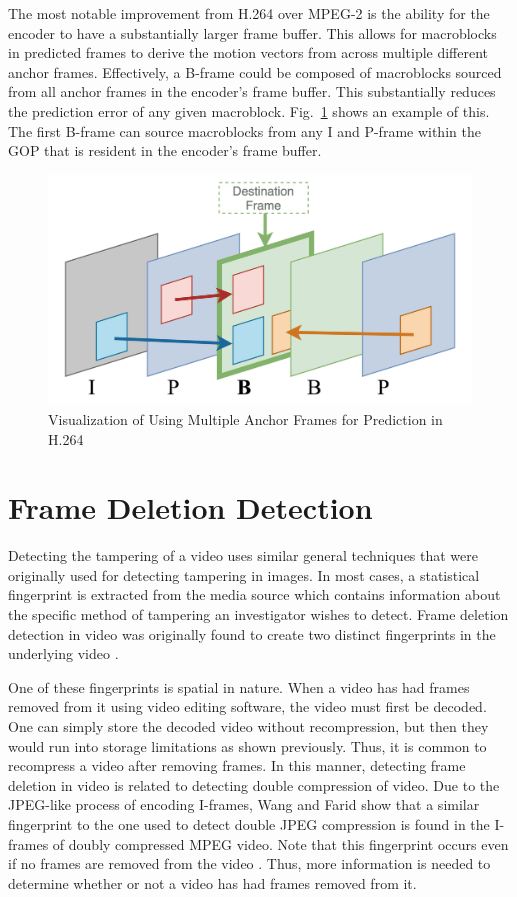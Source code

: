 The most notable improvement from H.264 over MPEG-2 is the ability for the encoder to have a substantially larger frame buffer. This allows for macroblocks in predicted frames to derive the motion vectors from across multiple different anchor frames. Effectively, a B-frame could be composed of macroblocks sourced from all anchor frames in the encoder's frame buffer. This substantially reduces the prediction error of any given macroblock. Fig.~\ref{multipred} shows an example of this. The first B-frame can source macroblocks from any I and P-frame within the GOP that is resident in the encoder's frame buffer.

\begin{figure}[htbp]
\centerline{\includegraphics[width=0.9\linewidth]{Background/multi_frame_pred.png}}
\caption{Visualization of Using Multiple Anchor Frames for Prediction in H.264}
\label{multipred}
\end{figure}

\section{Frame Deletion Detection}

Detecting the tampering of a video uses similar general techniques that were originally used for detecting tampering in images. In most cases, a statistical fingerprint is extracted from the media source which contains information about the specific method of tampering an investigator wishes to detect. Frame deletion detection in video was originally found to create two distinct fingerprints in the underlying video \cite{wang}. 

One of these fingerprints is spatial in nature. When a video has had frames removed from it using video editing software, the video must first be decoded. One can simply store the decoded video without recompression, but then they would run into storage limitations as shown previously. Thus, it is common to recompress a video after removing frames. In this manner, detecting frame deletion in video is related to detecting double compression of video. Due to the JPEG-like process of encoding I-frames, Wang and Farid show that a similar fingerprint to the one used to detect double JPEG compression \cite{doubleJPEG} \cite{doubleJPEG2} is found in the I-frames of doubly compressed MPEG video. Note that this fingerprint occurs even if no frames are removed from the video \cite{wang}. Thus, more information is needed to determine whether or not a video has had frames removed from it.

